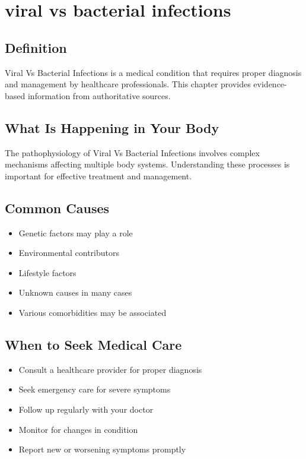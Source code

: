 
\chapter{viral vs bacterial infections}

\section*{Definition}
Viral Vs Bacterial Infections is a medical condition that requires proper diagnosis and management by healthcare professionals. This chapter provides evidence-based information from authoritative sources.

\section*{What Is Happening in Your Body}
The pathophysiology of Viral Vs Bacterial Infections involves complex mechanisms affecting multiple body systems. Understanding these processes is important for effective treatment and management.

\section*{Common Causes}
\begin{itemize}
  \item Genetic factors may play a role
  \item Environmental contributors
  \item Lifestyle factors
  \item Unknown causes in many cases
  \item Various comorbidities may be associated
\end{itemize}

\section*{When to Seek Medical Care}
\begin{itemize}
  \item Consult a healthcare provider for proper diagnosis
  \item Seek emergency care for severe symptoms
  \item Follow up regularly with your doctor
  \item Monitor for changes in condition
  \item Report new or worsening symptoms promptly
\end{itemize}

